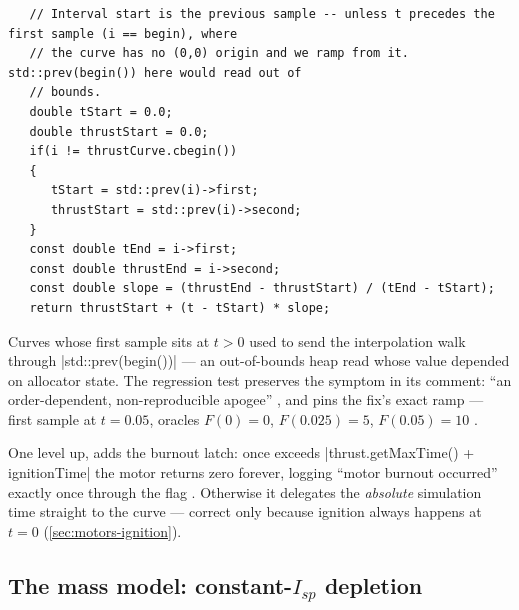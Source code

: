 \begin{listing}[htbp]
\begin{verbatim}
   // Interval start is the previous sample -- unless t precedes the first sample (i == begin), where
   // the curve has no (0,0) origin and we ramp from it. std::prev(begin()) here would read out of
   // bounds.
   double tStart = 0.0;
   double thrustStart = 0.0;
   if(i != thrustCurve.cbegin())
   {
      tStart = std::prev(i)->first;
      thrustStart = std::prev(i)->second;
   }
   const double tEnd = i->first;
   const double thrustEnd = i->second;
   const double slope = (thrustEnd - thrustStart) / (tEnd - tStart);
   return thrustStart + (t - tStart) * slope;
\end{verbatim}
\caption{The implicit-origin ramp . When the query time
precedes the first measured sample, the curve interpolates from an implicit $(0,0)$
origin instead of dereferencing .}\label{lst:motors-ramp}
\end{listing}

\begin{keyinsight}
Curves whose first sample sits at $t>0$ used to send the interpolation walk through
\cppinline|std::prev(begin())| --- an out-of-bounds heap read whose value depended on
allocator state. The regression test preserves the symptom in its comment: ``an
order-dependent, non-reproducible apogee'' ,
and pins the fix's exact ramp --- first sample at $t=0.05$, oracles $F(0)=0$,
$F(0.025)=5$, $F(0.05)=10$ . \ok
\end{keyinsight}

One level up,  adds the burnout latch: once
 exceeds \cppinline|thrust.getMaxTime() + ignitionTime| the motor returns
zero forever, logging ``motor burnout occurred'' exactly once through the
 flag . Otherwise it delegates the
\emph{absolute} simulation time straight to the curve  ---
correct only because ignition always happens at $t=0$ (\cref{sec:motors-ignition}).

\subsection{The mass model: constant-$I_{sp}$ depletion}\label{sec:motors-mass}

